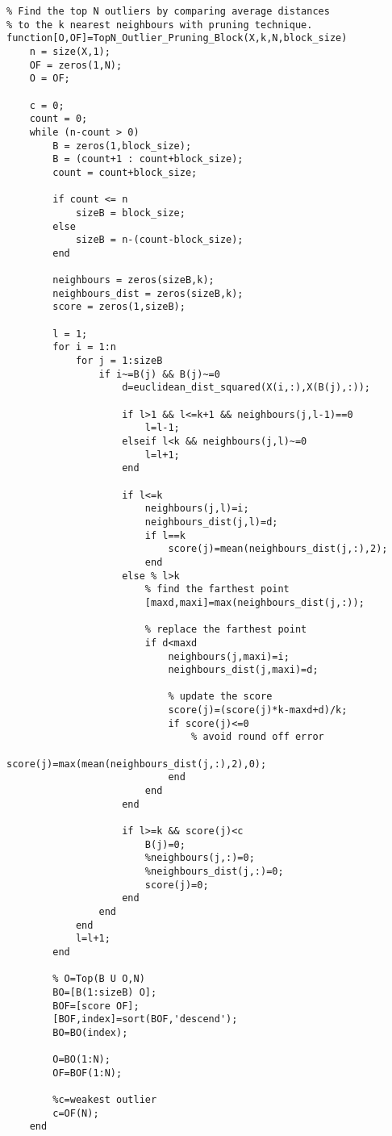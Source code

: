 \lstset{language=Matlab}
\begin{lstlisting}
% Find the top N outliers by comparing average distances
% to the k nearest neighbours with pruning technique.
function[O,OF]=TopN_Outlier_Pruning_Block(X,k,N,block_size)
	n = size(X,1);
	OF = zeros(1,N);
	O = OF;

	c = 0;
	count = 0;
	while (n-count > 0)
		B = zeros(1,block_size);
		B = (count+1 : count+block_size);
		count = count+block_size;

		if count <= n
			sizeB = block_size;
		else
			sizeB = n-(count-block_size);
		end

		neighbours = zeros(sizeB,k);
		neighbours_dist = zeros(sizeB,k);
		score = zeros(1,sizeB);

		l = 1;
		for i = 1:n
			for j = 1:sizeB
				if i~=B(j) && B(j)~=0
					d=euclidean_dist_squared(X(i,:),X(B(j),:));

					if l>1 && l<=k+1 && neighbours(j,l-1)==0
						l=l-1;
					elseif l<k && neighbours(j,l)~=0
						l=l+1;
					end

					if l<=k
						neighbours(j,l)=i;
						neighbours_dist(j,l)=d;
						if l==k
							score(j)=mean(neighbours_dist(j,:),2);
						end
					else % l>k
						% find the farthest point
						[maxd,maxi]=max(neighbours_dist(j,:));

						% replace the farthest point
						if d<maxd
							neighbours(j,maxi)=i;
							neighbours_dist(j,maxi)=d;

							% update the score
							score(j)=(score(j)*k-maxd+d)/k;
							if score(j)<=0
								% avoid round off error
								score(j)=max(mean(neighbours_dist(j,:),2),0);
							end
						end
					end

					if l>=k && score(j)<c
						B(j)=0;
						%neighbours(j,:)=0;
						%neighbours_dist(j,:)=0;
						score(j)=0;
					end
				end
			end
			l=l+1;
		end

		% O=Top(B U O,N)
		BO=[B(1:sizeB) O];
		BOF=[score OF];
		[BOF,index]=sort(BOF,'descend');
		BO=BO(index);

		O=BO(1:N);
		OF=BOF(1:N);

		%c=weakest outlier
		c=OF(N);
	end
\end{lstlisting}
